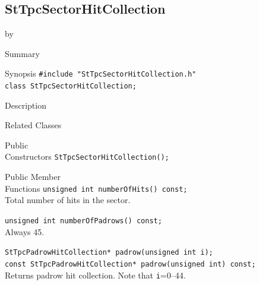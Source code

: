 \documentclass[twoside]{article}
\newcommand{\entrylabel}[1]{\mbox{\textbf{{#1}}}\hfil}%
\newenvironment{entry}
{\begin{list}{}%
    {\renewcommand{\makelabel}{\entrylabel}%
     \setlength{\labelwidth}{90pt}%
     \setlength{\leftmargin}{\labelwidth}
     \advance\leftmargin by \labelsep%
      }%
    }%
  {\end{list}}
\newcommand{\Entrylabel}[1]%
{\raisebox{0pt}[1ex][0pt]{\makebox[\labelwidth][l]%
    {\parbox[t]{\labelwidth}{\hspace{0pt}\textbf{{#1}}}}}}
\newenvironment{Entry}%
{\renewcommand{\entrylabel}{\Entrylabel}\begin{entry}}%
  {\end{entry}}
\begin{document}
\subsection{StTpcSectorHitCollection}
\label{sec:StTpcSectorHitCollection}
\begin{Entry}
\item[Summary]
\item[Synopsis]
    \verb+#include "StTpcSectorHitCollection.h"+\\
    \verb+class StTpcSectorHitCollection;+\\
\item[Description]
\item[Related Classes]
\item[Public\\ Constructors]
    \verb+StTpcSectorHitCollection();+\\
\item[Public Member\\ Functions]
    \verb+unsigned int numberOfHits() const;+\\
    Total number of hits in the sector.
    
    \verb+unsigned int numberOfPadrows() const;+\\
    Always 45.
    
    \verb+StTpcPadrowHitCollection* padrow(unsigned int i);+\\
    \verb+const StTpcPadrowHitCollection* padrow(unsigned int) const;+\\
    Returns padrow hit collection. Note that \texttt{i}=0--44.
    
\end{Entry}
\clearpage
\end{document}
